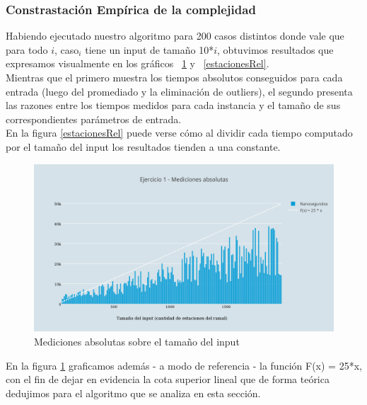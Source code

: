 \subsubsection{Constrastaci\'on Emp\'irica de la complejidad}

Habiendo ejecutado nuestro algoritmo para 200 casos distintos donde vale que para todo $i$, caso$_{i}$ tiene un input de tamaño 10*$i$, obtuvimos resultados que expresamos visualmente en los gráficos  ~\ref{estacionesAbs} y ~\ref{estacionesRel}.\\

Mientras que el primero muestra los tiempos absolutos conseguidos para cada entrada (luego del promediado y la eliminación de outliers), el segundo presenta las razones entre los tiempos medidos para cada instancia y el tamaño de sus correspondientes parámetros de entrada. \\

En la figura \ref{estacionesRel} puede verse cómo al dividir cada tiempo computado por el tamaño del input los resultados tienden a una constante.

  \begin{figure}[h!]
   \begin{center}
 	\includegraphics[scale=0.8]{imagenes/ej1/absolutas.png}
	\caption{Mediciones absolutas sobre el tamaño del input}
	\label{estacionesAbs}
   \end{center}
 \end{figure}
 
 En la figura \ref{estacionesAbs} graficamos además - a modo de referencia - la función F(x) = 25*x, con el fin de dejar en evidencia la cota superior lineal que de forma teórica dedujimos para el algoritmo que se analiza en esta sección. \\

